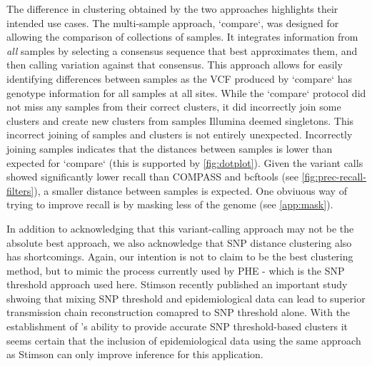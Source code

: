The difference in clustering obtained by the two \pandora{} approaches highlights their intended use cases. The multi-sample approach, `compare`, was designed for allowing the comparison of collections of samples. It integrates information from \emph{all} samples by selecting a consensus sequence that best approximates them, and then calling variation against that consensus. This approach allows for easily identifying differences between samples as the VCF produced by `compare` has genotype information for all samples at all sites. While the `compare` protocol did not miss any samples from their correct clusters, it did incorrectly join some clusters and create new clusters from samples Illumina deemed singletons. This incorrect joining of samples and clusters is not entirely unexpected. Incorrectly joining samples indicates that the distances between samples is lower than expected for `compare` (this is supported by \autoref{fig:dotplot}). Given the \pandora{} variant calls showed significantly lower recall than COMPASS and bcftools (see \autoref{fig:prec-recall-filters}), a smaller distance between samples is expected. One obviuous way of trying to improve recall is by masking less of the genome (see \autoref{app:mask}). 

In addition to acknowledging that this variant-calling approach may not be the absolute best approach, we also acknowledge that SNP distance clustering also has shortcomings. Again, our intention is not to claim to be the best clustering method, but to mimic the process currently used by PHE - which is the SNP threshold approach used here. Stimson \etal{} recently published an important study shwoing that mixing SNP threshold and epidemiological data can lead to superior transmission chain reconstruction comapred to SNP threshold alone. With the establishment of \ont{}'s ability to provide accurate SNP threshold-based clusters it seems certain that the inclusion of epidemiological data using the same approach as Stimson \etal{} can only improve inference for this application.

